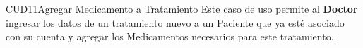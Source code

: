\begin{UseCase}{CUD11}{Agregar Medicamento a Tratamiento}
    {
   		Este caso de uso permite al \textbf{Doctor} ingresar los datos de un tratamiento nuevo a un Paciente que ya esté asociado con su cuenta y agregar los Medicamentos necesarios para este tratamiento..
    }


\end{UseCase}
